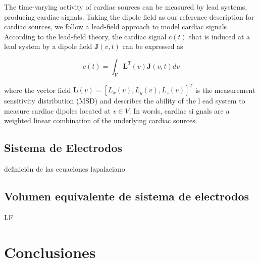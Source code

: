  The time-varying activity of cardiac sources can be measured by lead systems,
 producing cardiac signals. Taking the dipole field as our reference description
 for cardiac sources, we follow a lead-field approach to model cardiac signals
 \cite{Malmivuo95}. According to the lead-field theory, the cardiac signal
 $c(t)$ that is induced at a lead system by a dipole field $\mathbf{J}(v,t)$ can
 be expressed as

\begin{equation}\label{eq:EqSintesis}
c(t)=\int_V{\mathbf{L}^{T}(v) \mathbf{J}(v,t)}{dv}
\end{equation}

 where the vector field $\mathbf{L}(v)= [L_x(v), L_y(v), L_z(v)]^T$ is the
 measurement sensitivity distribution (MSD) and describes the ability of the
l ead system to measure cardiac dipoles located at $v\in V$. In words, cardiac
si gnals are a weighted linear combination of the underlying cardiac sources.



\subsection{Sistema de Electrodos}
definición de las ecuaciones lapalaciano
\subsection{Volumen equivalente de sistema de electrodos}
 \ac{LF}


\section{Conclusiones}
